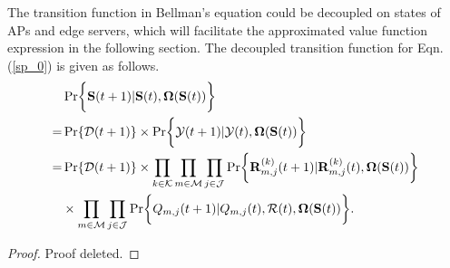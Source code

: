 \begin{lemma}
    The transition function in Bellman's equation could be decoupled on states of APs and edge servers, which will facilitate the approximated value function expression in the following section.
    The decoupled transition function for Eqn. (\ref{sp_0}) is given as follows.
    \begin{align}
        & \Pr\Brace{ \Stat({t+1})|\Stat({t}), \Policy(\Stat({t})) }
        \nonumber\\
        =& \Pr\{\mathcal{D}({t+1})\} \times \Pr\Brace{ \Obsv({t+1})|\Obsv({t}), \Policy(\Stat({t}))}
        \nonumber\\
        =& \Pr\{\mathcal{D}({t+1})\} \times \prod_{k\in\apSet}\prod_{m\in\esSet}\prod_{j\in\jSpace}
                \Pr\Brace{
                    \vec{R}^{(k)}_{m,j}({t+1}) | \vec{R}^{(k)}_{m,j}({t}),
                    \Policy(\Stat({t}))
                }  
            \nonumber\\
            & \times \prod_{m\in\esSet}\prod_{j\in\jSpace}
                \Pr\Brace{
                    Q_{m,j}({t+1})|Q_{m,j}({t}), \mathcal{R}({t}), \Policy(\Stat({t}))
                }.
    \end{align}
\end{lemma}
\begin{proof}
    Proof deleted.
\end{proof}

